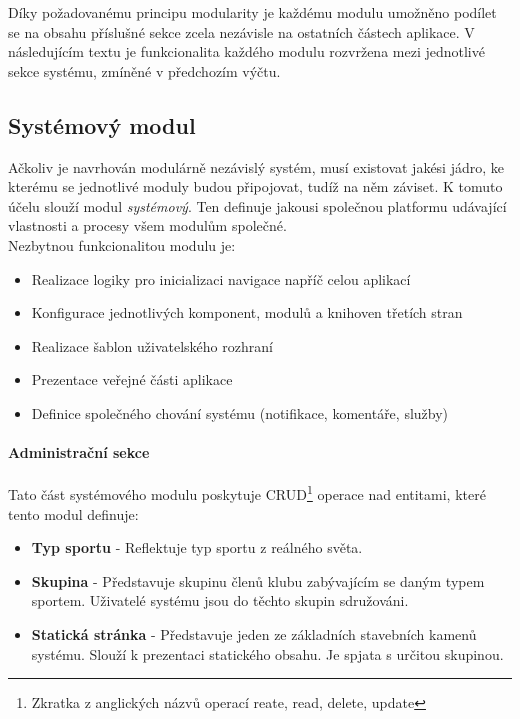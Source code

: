 \documentclass[11pt,oneside]{fithesis}
\begin{document}
        Díky požadovanému principu modularity je každému modulu umožněno podílet se na obsahu příslušné sekce zcela nezávisle na ostatních částech aplikace. V následujícím textu je funkcionalita každého modulu rozvržena mezi jednotlivé sekce systému, zmíněné v předchozím výčtu.


            \subsection{Systémový modul}
            Ačkoliv je navrhován modulárně nezávislý systém, musí existovat jakési jádro, ke kterému se jednotlivé moduly budou připojovat, tudíž na něm záviset. K tomuto účelu slouží modul \textit{systémový}. Ten definuje jakousi společnou platformu udávající vlastnosti a procesy všem modulům společné.\\

            Nezbytnou funkcionalitou modulu je:
            \begin{itemize}
                \item Realizace logiky pro inicializaci navigace napříč celou aplikací
                \item Konfigurace jednotlivých komponent, modulů a knihoven třetích stran
                \item Realizace šablon uživatelského rozhraní
                \item Prezentace veřejné části aplikace
                \item Definice společného chování systému (notifikace, komentáře, služby)
            \end{itemize}

            \paragraph*{Administrační sekce}

            Tato část systémového modulu poskytuje CRUD\footnote{Zkratka z anglických názvů operací reate, read, delete, update} operace nad entitami, které tento modul definuje: 
            \begin{itemize}
                \item \textbf{Typ sportu} - Reflektuje typ sportu z reálného světa.

                \item \textbf{Skupina} - Představuje skupinu členů klubu zabývajícím se daným typem sportem. Uživatelé systému jsou do těchto skupin sdružováni.
            
                \item \textbf{Statická stránka} - Představuje jeden ze základních stavebních kamenů systému. Slouží k prezentaci statického obsahu. Je spjata s určitou skupinou.
            \end{itemize}
            
\end{document}
